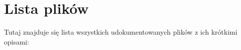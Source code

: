 \section{\-Lista plików}
\-Tutaj znajduje się lista wszystkich udokumentowanych plików z ich krótkimi opisami\-:\begin{DoxyCompactList}
\item{}
\end{DoxyCompactList}
